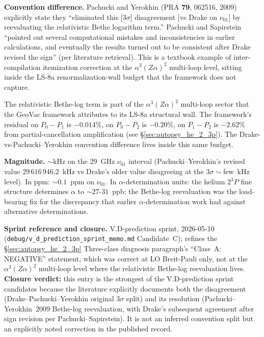 \documentclass[11pt]{article}
\begin{document}
\textbf{Convention difference.}  Pachucki and Yerokhin
(PRA \textbf{79}, 062516, 2009) explicitly state they ``eliminated this
[3$\sigma$] disagreement [vs Drake on $\nu_{01}$] by reevaluating the
relativistic Bethe logarithm term.''  Pachucki and Sapirstein
``pointed out several computational mistakes and inconsistencies in
earlier calculations, and eventually the results turned out to be
consistent after Drake revised the sign'' (per literature retrieval).
This is a textbook example of inter-compilation itemization correction
at the $\alpha^3 (Z\alpha)^2$ multi-loop level, sitting inside the
LS-8a renormalization-wall budget that the framework does not capture.

The relativistic Bethe-log term is part of the $\alpha^3(Z\alpha)^2$
multi-loop sector that the GeoVac framework attributes to its LS-8a
structural wall.  The framework's residual on $P_0 - P_1$ is
$-0.014\%$, on $P_0 - P_2$ is $-0.20\%$, on $P_1 - P_2$ is $-2.62\%$
from partial-cancellation amplification (see \S\ref{sec:autopsy_he_2_3p}).
The Drake-vs-Pachucki--Yerokhin convention difference lives inside
this same budget.

\textbf{Magnitude.}  $\sim$kHz on the 29~GHz $\nu_{01}$ interval
(Pachucki--Yerokhin's revised value $29\,616\,946.2$~kHz vs Drake's
older value disagreeing at the 3$\sigma \sim$few~kHz level).  In
ppm: $\sim 0.1$~ppm on $\nu_{01}$.  In $\alpha$-determination units:
the helium $2{}^3P$ fine structure determines $\alpha$ to $\sim 27$-$31$~ppb;
the Bethe-log reevaluation was the load-bearing fix for the discrepancy
that earlier $\alpha$-determination work had against alternative
determinations.

\textbf{Sprint reference and closure.}  V.D-prediction sprint, 2026-05-10
(\texttt{debug/v\_d\_prediction\_sprint\_memo.md} Candidate~C); refines
the \S\ref{sec:autopsy_he_2_3p} Three-class diagnosis paragraph's
``Class~A: NEGATIVE'' statement, which was correct at LO Breit-Pauli
only, not at the $\alpha^3(Z\alpha)^2$ multi-loop level where the
relativistic Bethe-log reevaluation lives.  \textbf{Closure verdict:}
this entry is the strongest of the V.D-prediction sprint candidates
because the literature explicitly documents both the disagreement
(Drake--Pachucki--Yerokhin original 3$\sigma$ split) and its resolution
(Pachucki--Yerokhin~2009 Bethe-log reevaluation, with Drake's subsequent
agreement after sign revision per Pachucki--Sapirstein).  It is not an
inferred convention split but an explicitly noted correction in the
published record.
\end{document}
